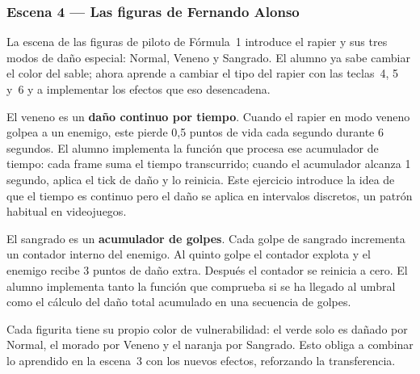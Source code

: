 \documentclass[a4paper,12pt]{article}
\newcounter{subsubsubsection}[subsubsection]
\begin{document}
\hypertarget{esc4}{\subsubsection{Escena 4 — Las figuras de Fernando Alonso}}

La escena de las figuras de piloto de Fórmula~1 introduce el rapier y sus tres modos
de daño especial: Normal, Veneno y Sangrado. El alumno ya sabe cambiar el color del
sable; ahora aprende a cambiar el tipo del rapier con las teclas~4, 5 y~6 y a
implementar los efectos que eso desencadena.


El veneno es un \textbf{daño continuo por tiempo}. Cuando el rapier en modo veneno
golpea a un enemigo, este pierde 0{,}5 puntos de vida cada segundo durante 6 segundos.
El alumno implementa la función que procesa ese acumulador de tiempo: cada frame suma
el tiempo transcurrido; cuando el acumulador alcanza 1 segundo, aplica el tick de
daño y lo reinicia. Este ejercicio introduce la idea de que el tiempo es continuo
pero el daño se aplica en intervalos discretos, un patrón habitual en videojuegos.


El sangrado es un \textbf{acumulador de golpes}. Cada golpe de sangrado incrementa
un contador interno del enemigo. Al quinto golpe el contador explota y el enemigo
recibe 3 puntos de daño extra. Después el contador se reinicia a cero. El alumno
implementa tanto la función que comprueba si se ha llegado al umbral como el cálculo
del daño total acumulado en una secuencia de golpes.

Cada figurita tiene su propio color de vulnerabilidad: el verde solo es dañado por
Normal, el morado por Veneno y el naranja por Sangrado. Esto obliga a combinar lo
aprendido en la escena~3 con los nuevos efectos, reforzando la transferencia.
\end{document}
